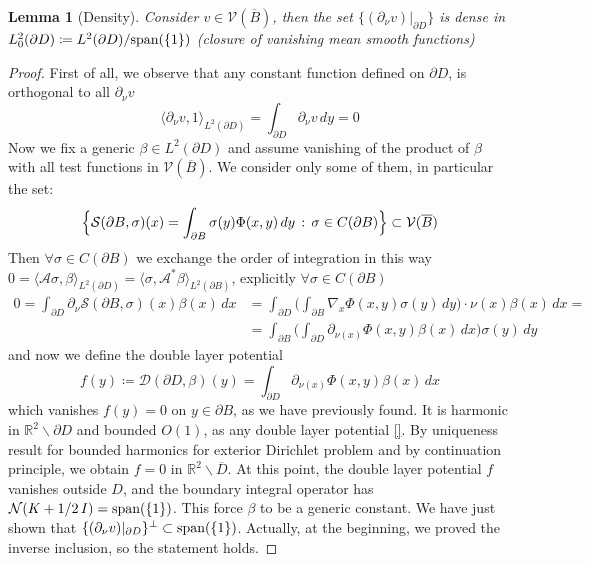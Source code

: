\documentclass[10pt, a4paper, twoside, openright]{book}
\theoremstyle{definition}
\theoremstyle{plain}
\theoremstyle{plain}
\theoremstyle{plain}
\theoremstyle{plain}
\theoremstyle{plain}
\newtheorem{lemma}[subsection]{Lemma}
\theoremstyle{plain}
\theoremstyle{plain}
\theoremstyle{plain}
\begin{document}
\begin{lemma}[Density]
\label{lemma:density-V-1}
 Consider $v\in \mathcal{V}(\overline{B})$, then the set $\{(\partial_\nu v )|_{\partial D}\}$ is dense in $L^2_0(\partial D)\coloneqq L^2(\partial D)/\textup{span}(\{1\})$ (closure of vanishing mean smooth functions)
\end{lemma}
\begin{proof}
 First of all, we observe that any constant function defined on $\partial D$, is orthogonal to all $\partial_\nu v$
 \begin{equation*}
  \langle \partial_\nu v, 1\rangle_{L^2(\partial D)} = \int_{\partial D}\partial_\nu v\,dy=0
 \end{equation*}
 Now we fix a generic $\beta\in L^2(\partial D)$ and assume vanishing of the product of $\beta$ with all test functions in $\mathcal{V}(\overline{B})$. 
 We consider only some of them, in particular the set:
 \begin{equation}
  \Bigl\{\mathcal{S}(\partial B, \sigma)(x) = \int_{\partial B} \sigma(y)\Phi(x,y)\,dy\,:\, \sigma \in C(\partial B)\Bigr\} \subset \mathcal{V}(\overline{B})
 \end{equation}
 Then $\forall\sigma\in C(\partial B)$ we exchange the order of integration in this way $0=\langle\mathcal{A}\sigma,\beta\rangle_{L^2(\partial D)} =\langle\sigma,\mathcal{A}^*\beta\rangle_{L^2(\partial B)}$, explicitly $\forall\sigma\in C(\partial B)$
 \begin{align*}
  0 = \int_{\partial D}\partial_\nu \mathcal{S}(\partial B, \sigma)(x) \beta(x) \, dx &= \int_{\partial D}\Big( \int_{\partial B}\nabla_x \Phi(x,y) \sigma(y)\,dy\Big)\cdot\nu(x)\beta(x) \, dx = \\
   &= \int_{\partial B}\Big( \int_{\partial D}\partial_{\nu(x)} \Phi(x,y) \beta(x)\,dx\Big)\sigma(y) \, dy
 \end{align*}
 and now we define the double layer potential
 \begin{equation}
  f(y)\coloneqq \mathcal{D}(\partial D, \beta)(y)=\int_{\partial D}\partial_{\nu(x)} \Phi(x,y) \beta(x)\,dx
 \end{equation}
 which vanishes $f(y)=0$ on $y\in\partial B$, as we have previously found.
 It is harmonic in $\mathbb{R}^2\backslash\partial D$ and bounded $O(1)$, as any double layer potential \ref{}. By uniqueness result for bounded harmonics for exterior Dirichlet problem and by continuation principle, we obtain $f=0$ in $\mathbb{R}^2\backslash\overline{D}$. At this point, the double layer potential $f$ vanishes outside $D$, and the boundary integral operator has $\mathcal{N}(K+1/2\,I)=\textup{span}(\{1\})$. This force $\beta$ to be a generic constant. 
 We have just shown that $\{(\partial_\nu v )|_{\partial D}\}^\perp \subset \textup{span}(\{1\})$. Actually, at the beginning, we proved the inverse inclusion, so the statement holds.
\end{proof}
\end{document}

